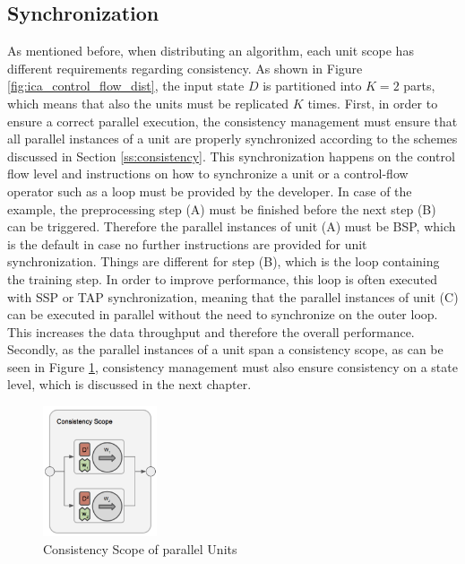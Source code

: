 \subsection{Synchronization}
As mentioned before, when distributing an algorithm, each unit scope has different requirements regarding consistency.
As shown in Figure \ref{fig:ica_control_flow_dist}, the input state $D$ is partitioned into $K = 2$ parts, which means that also the units must be replicated $K$ times.
First, in order to ensure a correct parallel execution, the consistency management must ensure that all parallel instances of a unit are properly synchronized according to the schemes discussed in Section \ref{ss:consistency}.
This synchronization happens on the control flow level and instructions on how to synchronize a unit or a control-flow operator such as a loop must be provided by the developer.
In case of the example, the preprocessing step (A) must be finished before the next step (B) can be triggered.
Therefore the parallel instances of unit (A) must be BSP, which is the default in case no further instructions are provided for unit synchronization.
Things are different for step (B), which is the loop containing the training step.
In order to improve performance, this loop is often executed with SSP or TAP synchronization, meaning that the parallel instances of unit (C) can be executed in parallel without the need to synchronize on the outer loop.
This increases the data throughput and therefore the overall performance.
Secondly, as the parallel instances of a unit span a consistency scope, as can be seen in Figure \ref{fig:consistency_scope}, consistency management must also ensure consistency on a state level, which is discussed in the next chapter.
\begin{figure}[ht]
\centering
\includegraphics[width=0.3\textwidth]{img/consistency_scope.png}
\caption{Consistency Scope of parallel Units}
\label{fig:consistency_scope}
\end{figure}

